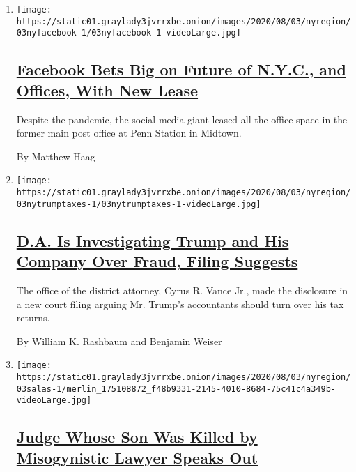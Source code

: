 \begin{enumerate}
\def\labelenumi{\arabic{enumi}.}
\item
  \texttt{[image: https://static01.graylady3jvrrxbe.onion/images/2020/08/03/nyregion/03nyfacebook-1/03nyfacebook-1-videoLarge.jpg]}

  \hypertarget{facebook-bets-big-on-future-of-nyc-and-offices-with-new-lease}{%
  \subsection{\texorpdfstring{\href{/2020/08/03/nyregion/facebook-nyc-office-farley-building.html}{Facebook
  Bets Big on Future of N.Y.C., and Offices, With New
  Lease}}{Facebook Bets Big on Future of N.Y.C., and Offices, With New Lease}}\label{facebook-bets-big-on-future-of-nyc-and-offices-with-new-lease}}

  Despite the pandemic, the social media giant leased all the office
  space in the former main post office at Penn Station in Midtown.

  By Matthew Haag
\item
  \texttt{[image: https://static01.graylady3jvrrxbe.onion/images/2020/08/03/nyregion/03nytrumptaxes-1/03nytrumptaxes-1-videoLarge.jpg]}

  \hypertarget{da-is-investigating-trump-and-his-company-over-fraud-filing-suggests}{%
  \subsection{\texorpdfstring{\href{/2020/08/03/nyregion/donald-trump-taxes-cyrus-vance.html}{D.A.
  Is Investigating Trump and His Company Over Fraud, Filing
  Suggests}}{D.A. Is Investigating Trump and His Company Over Fraud, Filing Suggests}}\label{da-is-investigating-trump-and-his-company-over-fraud-filing-suggests}}

  The office of the district attorney, Cyrus R. Vance Jr., made the
  disclosure in a new court filing arguing Mr. Trump's accountants
  should turn over his tax returns.

  By William K. Rashbaum and Benjamin Weiser
\item
  \texttt{[image: https://static01.graylady3jvrrxbe.onion/images/2020/08/03/nyregion/03salas-1/merlin\_175108872\_f48b9331-2145-4010-8684-75c41c4a349b-videoLarge.jpg]}

  \hypertarget{judge-whose-son-was-killed-by-misogynistic-lawyer-speaks-out}{%
  \subsection{\texorpdfstring{\href{/2020/08/03/nyregion/esther-salas-roy-den-hollander.html}{Judge
  Whose Son Was Killed by Misogynistic Lawyer Speaks
  Out}}{Judge Whose Son Was Killed by Misogynistic Lawyer Speaks Out}}\label{judge-whose-son-was-killed-by-misogynistic-lawyer-speaks-out}}


\end{enumerate}
